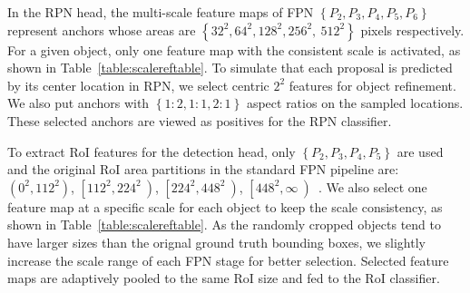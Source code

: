 \documentclass[runningheads]{llncs}
\begin{document}
In the RPN head, the multi-scale feature maps of FPN  $\left\{ P_{2},P_{3},P_{4},P_{5},P_{6} \right\}$ represent anchors whose areas are $\left\{ 32^{2},64^{2},128^{2},256^{2},~512^{2} \right\}$ pixels respectively. 
For a given object, only one feature map with the consistent scale is activated, as shown in Table~\ref{table:scalereftable}.
To simulate that each proposal is predicted by its center location in RPN, we select centric $2^{2}$ features for object refinement.
We also put anchors with $\left\{ 1:2,1:1,2:1 \right\}$ aspect ratios on the sampled locations.  
These selected anchors are viewed as positives for the RPN classifier. 

To extract RoI features for the detection head, only $\left\{ P_{2},P_{3},P_{4},P_{5} \right\}$ are used and the original RoI area partitions in the standard FPN pipeline are: $\left( {0^{2},112^{2}} \right)$, $\left\lbrack 112^{2},224^{2}~ \right)$, $\left\lbrack 224^{2},448^{2}~ \right)$, $\left\lbrack 448^{2},\infty~ \right)$~\cite{fpn}. 
We also select one feature map at a specific scale for each object to keep the scale consistency, as shown in Table~\ref{table:scalereftable}. 
As the randomly cropped objects tend to have larger sizes than the orignal ground truth bounding boxes, we slightly increase the scale range of each FPN stage for better selection.
Selected feature maps are adaptively pooled to the same RoI size and fed to the RoI classifier. 
\end{document}
